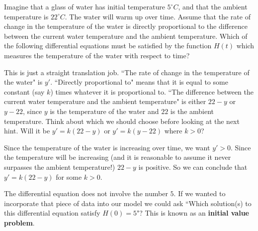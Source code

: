 \documentclass{ximera}
\begin{document}
\begin{question}
	Imagine that a glass of water has initial temperature $5^\circ \unit{C}$, and that the ambient temperature is $22^\circ \unit{C}$.  The water will warm up over time.  Assume that the rate of change in the temperature of the water is directly proportional to the difference between the current water temperature and the ambient temperature.  Which of the following differential equations must be satisfied by the function $H(t)$ which measures the temperature of the water with respect to time?
	
	\begin{multipleChoice}
	\end{multipleChoice}
	
	\begin{hint}
		This is just a straight translation job.  ``The rate of change in the temperature of the water" is $y'$.  ``Directly proportional to" means that it is equal to some constant (say $k$) times whatever it is proportional to.  ``The difference between the current water temperature and the ambient temperature" is either $22-y$ or $y-22$, since $y$ is the temperature of the water and $22$ is the ambient temperature.   Think about which we should choose before looking at the next hint.  Will it be $y'=k(22-y)$ or $y'=k(y-22)$ where $k>0$?
	\end{hint}
	
	\begin{hint}
		Since the temperature of the water is increasing over time, we want $y'>0$.  Since the temperature will be increasing (and it is reasonable to assume it never surpasses the ambient temperature!)  $22-y$ is positive.  So we can conclude that $y' = k(22-y)$ for some $k>0$.  
	\end{hint}

	\begin{feedback}
		The differential equation does not involve the number $5$.  If we wanted to incorporate that piece of data into our model we could ask ``Which solution(s) to this differential equation satisfy $H(0) = 5$"?  This is known as an \textbf{initial value problem}. 
	\end{feedback}
\end{question} 
\end{document}
